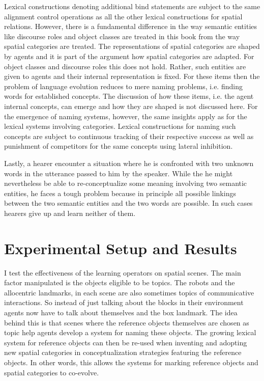 Lexical constructions denoting additional bind statements are subject to the same
alignment control operations as all the other lexical constructions for spatial relations.
However, there is a fundamental difference in the way semantic entities like discourse roles and 
object classes are treated in this book from the way spatial categories are treated. 
The representations of spatial categories are shaped by agents and it is part of the argument
how spatial categories are adapted. For object classes
and discourse roles this does not hold. Rather, 
such entities are given to agents and their internal representation is fixed. 
For these items then the problem of language evolution reduces to mere naming 
problems, i.e. finding words for established concepts. The discussion of how these items, 
i.e.  the agent internal concepts, can emerge and how they are shaped is not discussed 
here. For the emergence of naming systems, however, the same 
insights apply as for the lexical systems involving categories. Lexical constructions for naming such
concepts are subject to continuous tracking of their respective success as well as punishment of competitors
for the same concepts using lateral inhibition. 

Lastly, a hearer encounter a situation where he is confronted 
with two unknown words in
the utterance passed to him by the speaker. While the he might 
nevertheless be able 
to re-conceptualize some meaning involving two semantic entities, 
he faces a tough problem because in principle all possible linkings 
between the two semantic entities and the two words are possible. 
In such cases hearers give up and learn neither of them. 

\section{Experimental Setup and Results}
I test the effectiveness of the learning operators on spatial scenes. 
The main factor manipulated
is the objects eligible to be topics. The robots and the allocentric landmarks, 
in each scene are also sometimes topics of communicative interactions. 
So instead of just talking about the blocks in their environment
agents now have to talk about themselves and the box landmark. The idea behind this is that 
scenes where the reference objects themselves are chosen as topic help agents develop a system for 
naming these objects. The growing lexical system for reference objects can then be re-used when 
inventing and adopting new spatial categories in conceptualization strategies featuring the reference objects.
In other words, this allows the systems for marking reference objects and spatial categories to co-evolve.

